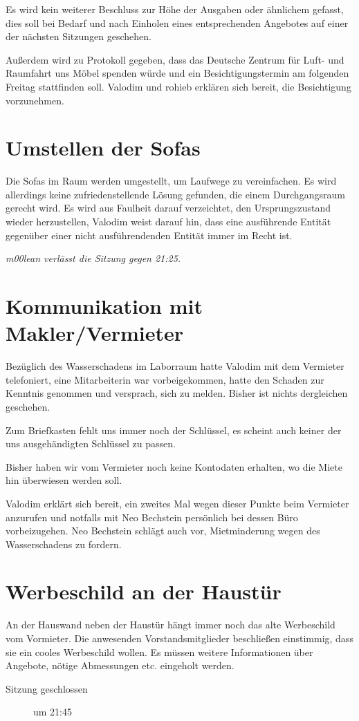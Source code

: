 \documentclass[a4paper,12pt]{scrartcl}
\begin{document}
Es wird kein weiterer Beschluss zur Höhe der Ausgaben oder ähnlichem gefasst,
dies soll bei Bedarf und nach Einholen eines entsprechenden Angebotes auf einer
der nächsten Sitzungen geschehen.

Außerdem wird zu Protokoll gegeben, dass das Deutsche Zentrum für Luft- und
Raumfahrt uns Möbel spenden würde und ein Besichtigungstermin am folgenden
Freitag stattfinden soll. Valodim und rohieb erklären sich bereit, die
Besichtigung vorzunehmen.

\section{Umstellen der Sofas}
Die Sofas im Raum werden umgestellt, um Laufwege zu vereinfachen. Es wird
allerdings keine zufriedenstellende Lösung gefunden, die einem Durchgangsraum
gerecht wird. Es wird aus Faulheit darauf verzeichtet, den Ursprungszustand
wieder herzustellen, Valodim weist darauf hin, dass eine ausführende Entität
gegenüber einer nicht ausführendenden Entität immer im Recht ist.

\emph{m00lean verlässt die Sitzung gegen 21:25.}

\section{Kommunikation mit Makler/Vermieter}
Bezüglich des Wasserschadens im Laborraum hatte Valodim mit dem Vermieter
telefoniert, eine Mitarbeiterin war vorbeigekommen, hatte den Schaden zur
Kenntnis genommen und versprach, sich zu melden. Bisher ist nichts dergleichen
geschehen.

Zum Briefkasten fehlt uns immer noch der Schlüssel, es scheint auch keiner der
uns ausgehändigten Schlüssel zu passen.

Bisher haben wir vom Vermieter noch keine Kontodaten erhalten, wo die Miete hin
überwiesen werden soll.

Valodim erklärt sich bereit, ein zweites Mal wegen dieser Punkte beim Vermieter
anzurufen und notfalls mit Neo Bechstein persönlich bei dessen Büro
vorbeizugehen. Neo Bechstein schlägt auch vor, Mietminderung wegen des
Wasserschadens zu fordern.

\section{Werbeschild an der Haustür}
An der Hauswand neben der Haustür hängt immer noch das alte Werbeschild vom
Vormieter. Die anwesenden Vorstandsmitglieder beschließen einstimmig, dass sie
ein cooles Werbeschild wollen. Es müssen weitere Informationen über Angebote,
nötige Abmessungen etc. eingeholt werden.

\begin{description}
	\item[Sitzung geschlossen] um 21:45
\end{description}
\end{document}
